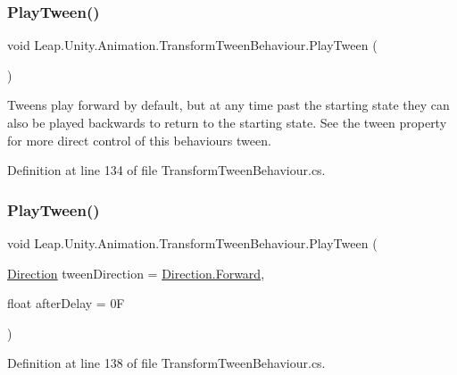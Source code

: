 \subsubsection{\texorpdfstring{PlayTween()}{PlayTween()}\hspace{0.1cm}{\footnotesize\ttfamily [1/2]}}
{\footnotesize\ttfamily void Leap.\+Unity.\+Animation.\+Transform\+Tween\+Behaviour.\+Play\+Tween (\begin{DoxyParamCaption}{ }\end{DoxyParamCaption})}



Tweens play forward by default, but at any time past the starting state they can also be played backwards to return to the starting state. See the tween property for more direct control of this behaviour\textquotesingle{}s tween. 



Definition at line 134 of file Transform\+Tween\+Behaviour.\+cs.

\mbox{\label{class_leap_1_1_unity_1_1_animation_1_1_transform_tween_behaviour_a1e24c5728cfe31a923d49a62cf3bd6dd}} 
\subsubsection{\texorpdfstring{PlayTween()}{PlayTween()}\hspace{0.1cm}{\footnotesize\ttfamily [2/2]}}
{\footnotesize\ttfamily void Leap.\+Unity.\+Animation.\+Transform\+Tween\+Behaviour.\+Play\+Tween (\begin{DoxyParamCaption}\item[{\mbox{\hyperlink{namespace_leap_1_1_unity_1_1_animation_ab080d4756e4d3d6a2fc9cd9a7f4e695a}{Direction}}}]{tween\+Direction = {\ttfamily \mbox{\hyperlink{namespace_leap_1_1_unity_1_1_animation_ab080d4756e4d3d6a2fc9cd9a7f4e695aa67d2f6740a8eaebf4d5c6f79be8da481}{Direction.\+Forward}}},  }\item[{float}]{after\+Delay = {\ttfamily 0F} }\end{DoxyParamCaption})}



Definition at line 138 of file Transform\+Tween\+Behaviour.\+cs.

